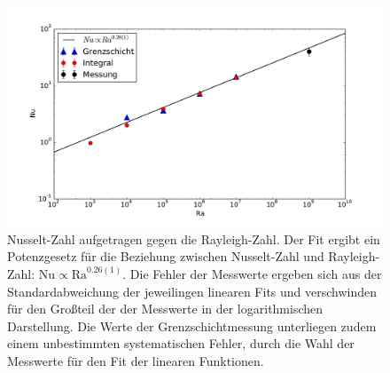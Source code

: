\begin{figure}
	\centering
	\includegraphics[width=\textwidth]{plots/nusselt_fit.pdf}\caption{Nusselt-Zahl aufgetragen gegen die Rayleigh-Zahl.
Der Fit ergibt ein Potenzgesetz für die Beziehung zwischen Nusselt-Zahl und Rayleigh-Zahl: \mbox{$\text{Nu} \propto \text{Ra}^{0.26(1)}$}. 
Die Fehler der Messwerte ergeben sich aus der Standardabweichung der jeweilingen linearen Fits und verschwinden für den Großteil der der Messwerte in der logarithmischen Darstellung. Die Werte der Grenzschichtmessung unterliegen zudem einem unbestimmten systematischen Fehler, durch die Wahl der Messwerte für den Fit der linearen Funktionen.}
\label{fig:nusselt}
\end{figure}










